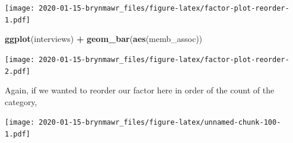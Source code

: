 \documentclass[]{book}
\newenvironment{Shaded}{\begin{snugshade}}{\end{snugshade}}
\newcommand{\KeywordTok}[1]{\textcolor[rgb]{0.13,0.29,0.53}{\textbf{#1}}}
\newcommand{\DataTypeTok}[1]{\textcolor[rgb]{0.13,0.29,0.53}{#1}}
\newcommand{\StringTok}[1]{\textcolor[rgb]{0.31,0.60,0.02}{#1}}
\newcommand{\OtherTok}[1]{\textcolor[rgb]{0.56,0.35,0.01}{#1}}
\newcommand{\OperatorTok}[1]{\textcolor[rgb]{0.81,0.36,0.00}{\textbf{#1}}}
\newcommand{\NormalTok}[1]{#1}
\begin{document}
\begin{Shaded}
\end{Shaded}

\texttt{[image: 2020-01-15-brynmawr\_files/figure-latex/factor-plot-reorder-1.pdf]}

\begin{Shaded}
\begin{Highlighting}[]
\KeywordTok{ggplot}\NormalTok{(interviews) }\OperatorTok{+}\StringTok{ }\KeywordTok{geom_bar}\NormalTok{(}\KeywordTok{aes}\NormalTok{(memb_assoc))}
\end{Highlighting}
\end{Shaded}

\texttt{[image: 2020-01-15-brynmawr\_files/figure-latex/factor-plot-reorder-2.pdf]}

Again, if we wanted to reorder our factor here in order of the count of
the category,

\begin{Shaded}
\end{Shaded}

\texttt{[image: 2020-01-15-brynmawr\_files/figure-latex/unnamed-chunk-100-1.pdf]}
\end{document}
